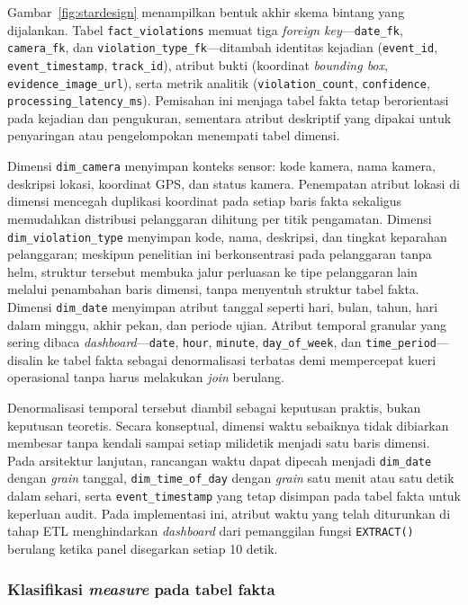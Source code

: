 Gambar~\ref{fig:stardesign} menampilkan bentuk akhir skema bintang yang dijalankan. Tabel \texttt{fact\_violations} memuat tiga \textit{foreign key}---\texttt{date\_fk}, \texttt{camera\_fk}, dan \texttt{violation\_type\_fk}---ditambah identitas kejadian (\texttt{event\_id}, \texttt{event\_timestamp}, \texttt{track\_id}), atribut bukti (koordinat \textit{bounding box}, \texttt{evidence\_image\_url}), serta metrik analitik (\texttt{violation\_count}, \texttt{confidence}, \texttt{processing\_latency\_ms}). Pemisahan ini menjaga tabel fakta tetap berorientasi pada kejadian dan pengukuran, sementara atribut deskriptif yang dipakai untuk penyaringan atau pengelompokan menempati tabel dimensi.

Dimensi \texttt{dim\_camera} menyimpan konteks sensor: kode kamera, nama kamera, deskripsi lokasi, koordinat GPS, dan status kamera. Penempatan atribut lokasi di dimensi mencegah duplikasi koordinat pada setiap baris fakta sekaligus memudahkan distribusi pelanggaran dihitung per titik pengamatan. Dimensi \texttt{dim\_violation\_type} menyimpan kode, nama, deskripsi, dan tingkat keparahan pelanggaran; meskipun penelitian ini berkonsentrasi pada pelanggaran tanpa helm, struktur tersebut membuka jalur perluasan ke tipe pelanggaran lain melalui penambahan baris dimensi, tanpa menyentuh struktur tabel fakta. Dimensi \texttt{dim\_date} menyimpan atribut tanggal seperti hari, bulan, tahun, hari dalam minggu, akhir pekan, dan periode ujian. Atribut temporal granular yang sering dibaca \textit{dashboard}---\texttt{date}, \texttt{hour}, \texttt{minute}, \texttt{day\_of\_week}, dan \texttt{time\_period}---disalin ke tabel fakta sebagai denormalisasi terbatas demi mempercepat kueri operasional tanpa harus melakukan \textit{join} berulang.

Denormalisasi temporal tersebut diambil sebagai keputusan praktis, bukan keputusan teoretis. Secara konseptual, dimensi waktu sebaiknya tidak dibiarkan membesar tanpa kendali sampai setiap milidetik menjadi satu baris dimensi. Pada arsitektur lanjutan, rancangan waktu dapat dipecah menjadi \texttt{dim\_date} dengan \textit{grain} tanggal, \texttt{dim\_time\_of\_day} dengan \textit{grain} satu menit atau satu detik dalam sehari, serta \texttt{event\_timestamp} yang tetap disimpan pada tabel fakta untuk keperluan audit. Pada implementasi ini, atribut waktu yang telah diturunkan di tahap ETL menghindarkan \textit{dashboard} dari pemanggilan fungsi \texttt{EXTRACT()} berulang ketika panel disegarkan setiap 10 detik.

\subsubsection{Klasifikasi \textit{measure} pada tabel fakta}

